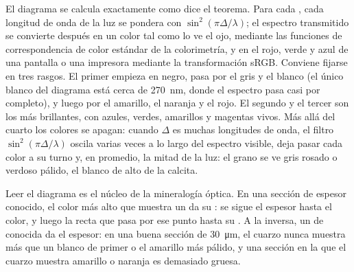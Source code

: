 El diagrama se calcula exactamente como dice el teorema. Para cada , cada longitud de onda de la luz se pondera
con $\sin^2(\pi\Delta/\lambda)$; el espectro transmitido se convierte después en un color tal como lo ve el ojo, mediante
las funciones de correspondencia de color estándar de la colorimetría, y en el rojo, verde y azul de una pantalla o una
impresora mediante la transformación sRGB. Conviene fijarse en tres rasgos. El primer  empieza en negro, pasa por el
gris y el blanco (el único blanco del diagrama está cerca de \qty{270}{nm}, donde el espectro pasa casi por completo), y
luego por el amarillo, el naranja y el rojo. El segundo y el tercer  son los más brillantes, con azules, verdes,
amarillos y magentas vivos. Más allá del cuarto  los colores se apagan: cuando $\Delta$ es muchas longitudes de
onda, el filtro $\sin^2(\pi\Delta/\lambda)$ oscila varias veces a lo largo del espectro visible, deja pasar cada color a su
turno y, en promedio, la mitad de la luz: el grano se ve gris rosado o verdoso pálido, el blanco de  alto de la calcita.

Leer el diagrama es el núcleo de la mineralogía óptica. En una sección de espesor conocido, el color más alto que muestra
un  da su : se sigue el espesor hasta el color, y luego la recta que pasa por ese punto hasta su
. A la inversa, un  de  conocida da el espesor: en una buena sección de
\qty{30}{\micro m}, el cuarzo nunca muestra más que un blanco de primer  o el amarillo más pálido, y una sección en la
que el cuarzo muestra amarillo o naranja es demasiado gruesa.

